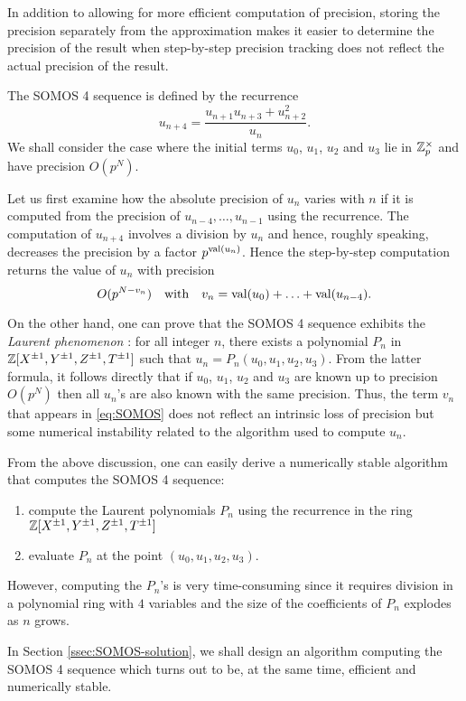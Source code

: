 \documentclass{lms}
\begin{document}
In addition to allowing for more efficient computation of precision, storing the precision separately from the
approximation makes it easier to determine the precision of the result when step-by-step precision tracking
does not reflect the actual precision of the result.

The SOMOS 4 sequence \cite{somos:89a} is defined by the recurrence
\[
u_{n+4} = \frac{u_{n+1} u_{n+3} + u_{n+2}^2}{u_n}.
\]
We shall consider the case where the initial
terms $u_0$, $u_1$, $u_2$ and $u_3$ lie in $\mathbb Z_p^\times$ and have precision $O(p^N)$.

Let us first examine how the absolute precision of $u_n$ varies with $n$
if it is computed from the precision of $u_{n-4}, \ldots, u_{n-1}$ using the recurrence.
The computation of $u_{n+4}$ involves a division by $u_n$ and hence, roughly speaking,
decreases the precision by a factor $p^{\text{\rm val}(u_n)}$.  Hence the
step-by-step computation returns the value of $u_n$ with precision
\begin{equation}
\label{eq:SOMOS}
O(p^{N-v_n})
\quad \text{with}\quad
v_n = \text{\rm val}(u_0) + \ldots + \text{\rm val}(u_{n-4}).
\end{equation}

On the other hand, one can prove that the SOMOS 4 sequence 
exhibits the \emph{Laurent phenomenon} \cite{fomin-zelevinsky:02a}: for all integer 
$n$, there exists a polynomial $P_n$ in $\mathbb Z[X^{\pm 1}, Y^{\pm 1}, Z^{\pm 
1}, T^{\pm 1}]$ such that $u_n = P_n(u_0, u_1, u_2, u_3)$.
From the latter formula, it follows directly that if $u_0$, $u_1$,
$u_2$ and $u_3$ are known up to precision $O(p^N)$ then all $u_n$'s
are also known with the same precision. Thus, the term $v_n$ that 
appears in \eqref{eq:SOMOS} does not reflect an intrinsic loss of
precision but some numerical instability related to the algorithm used to compute $u_n$.

\begin{rmk}
From the above discussion, one can easily derive a numerically stable 
algorithm that computes the SOMOS 4 sequence: 
\begin{enumerate}
\item compute the Laurent polynomials $P_n$ using the recurrence in 
the ring $\mathbb Z[X^{\pm 1}, Y^{\pm 1}, Z^{\pm 1}, T^{\pm 1}]$
\item evaluate $P_n$ at the point $(u_0, u_1, u_2, u_3)$.
\end{enumerate}
However, computing the $P_n$'s is very time-consuming since it requires 
division in a polynomial ring with $4$ variables and the
size of the coefficients of $P_n$ explodes as $n$ grows.

In Section \ref{ssec:SOMOS-solution}, we shall design an algorithm computing 
the SOMOS 4 sequence which turns out to be, at the same time, efficient 
and numerically stable.
\end{rmk}
\end{document}
